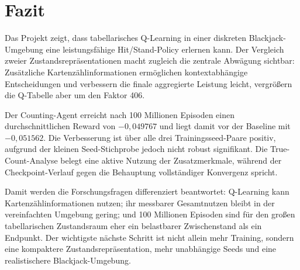 \section{Fazit}
\label{sec:fazit}

Das Projekt zeigt, dass tabellarisches Q-Learning in einer diskreten
Blackjack-Umgebung eine leistungsfähige Hit/Stand-Policy erlernen
kann. Der Vergleich zweier Zustandsrepräsentationen macht zugleich
die zentrale Abwägung sichtbar: Zusätzliche Kartenzählinformationen
ermöglichen kontextabhängige Entscheidungen und verbessern die finale
aggregierte Leistung leicht, vergrößern die Q-Tabelle aber um den Faktor 406.

Der Counting-Agent erreicht nach 100 Millionen Episoden einen
durchschnittlichen Reward von $-0{,}049767$ und liegt damit vor der
Baseline mit $-0{,}051562$. Die Verbesserung ist über alle drei
Trainingsseed-Paare positiv, aufgrund der kleinen Seed-Stichprobe
jedoch nicht robust signifikant. Die True-Count-Analyse belegt eine
aktive Nutzung der Zusatzmerkmale, während der Checkpoint-Verlauf
gegen die Behauptung vollständiger Konvergenz spricht.

Damit werden die Forschungsfragen differenziert beantwortet:
Q-Learning kann Kartenzählinformationen nutzen; ihr messbarer
Gesamtnutzen bleibt in der vereinfachten Umgebung gering; und 100
Millionen Episoden sind für den großen tabellarischen Zustandsraum
eher ein belastbarer Zwischenstand als ein Endpunkt. Der wichtigste
nächste Schritt ist nicht allein mehr Training, sondern eine
kompaktere Zustandsrepräsentation, mehr unabhängige Seeds und eine
realistischere Blackjack-Umgebung.

